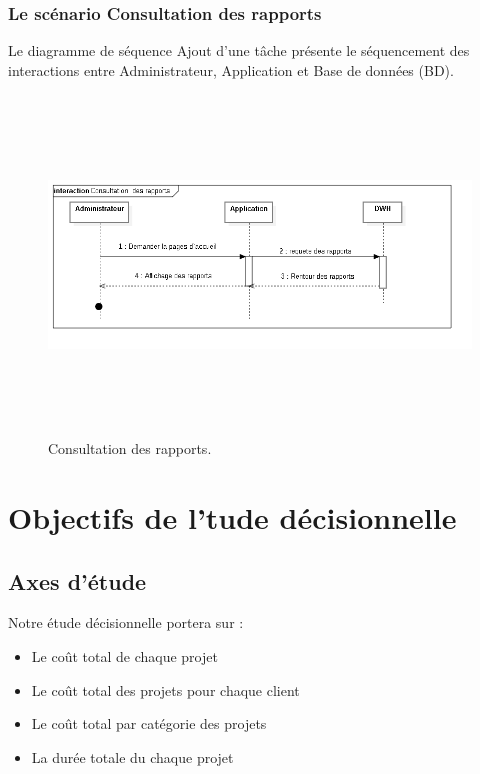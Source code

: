 \subsubsection{Le sc\'{e}nario \guillemotleft{} Consultation des rapports\guillemotright{}}
Le diagramme de s\'{e}quence \guillemotleft{} Ajout d'une t\^{a}che \guillemotright{} pr\'{e}sente le s\'{e}quencement
des interactions entre Administrateur, Application et Base de donn\'{e}es (BD).


\begin{figure}[H]
\center
\includegraphics[width=14cm,height=9cm]{./figures/seq/G.png}
\caption{Consultation des rapports.}
\end{figure}


\section{ Objectifs de l'tude d\'{e}cisionnelle }


\subsection{Axes d'\'{e}tude}
Notre \'{e}tude d\'{e}cisionnelle portera sur :

\begin{itemize}
  \item { Le co\^{u}t total de chaque projet}
  \item { Le co\^{u}t total des projets pour chaque client }
  \item { Le co\^{u}t total par cat\'{e}gorie des projets }
  \item { La dur\'{e}e totale du chaque projet }

\end{itemize}

